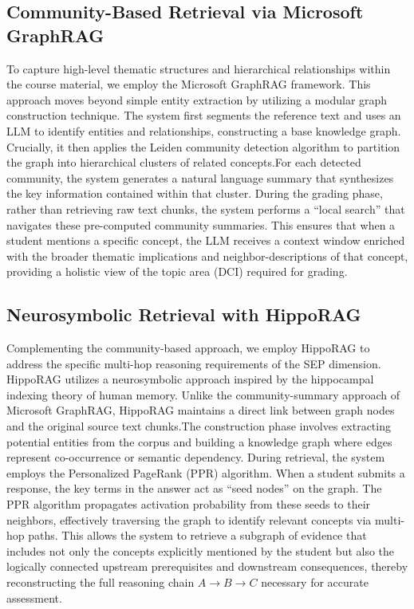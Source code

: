 \documentclass{edm_article}
\begin{document}
\subsection{Community-Based Retrieval via Microsoft GraphRAG}
To capture high-level thematic structures and hierarchical relationships within the course material, we employ the Microsoft GraphRAG framework. This approach moves beyond simple entity extraction by utilizing a modular graph construction technique. The system first segments the reference text and uses an LLM to identify entities and relationships, constructing a base knowledge graph. Crucially, it then applies the Leiden community detection algorithm to partition the graph into hierarchical clusters of related concepts.For each detected community, the system generates a natural language summary that synthesizes the key information contained within that cluster. During the grading phase, rather than retrieving raw text chunks, the system performs a ``local search'' that navigates these pre-computed community summaries. This ensures that when a student mentions a specific concept, the LLM receives a context window enriched with the broader thematic implications and neighbor-descriptions of that concept, providing a holistic view of the topic area (DCI) required for grading.

\subsection{Neurosymbolic Retrieval with HippoRAG}
Complementing the community-based approach, we employ HippoRAG to address the specific multi-hop reasoning requirements of the SEP dimension. HippoRAG utilizes a neurosymbolic approach inspired by the hippocampal indexing theory of human memory. Unlike the community-summary approach of Microsoft GraphRAG, HippoRAG maintains a direct link between graph nodes and the original source text chunks.The construction phase involves extracting potential entities from the corpus and building a knowledge graph where edges represent co-occurrence or semantic dependency. During retrieval, the system employs the Personalized PageRank (PPR) algorithm. When a student submits a response, the key terms in the answer act as ``seed nodes'' on the graph. The PPR algorithm propagates activation probability from these seeds to their neighbors, effectively traversing the graph to identify relevant concepts via multi-hop paths. This allows the system to retrieve a subgraph of evidence that includes not only the concepts explicitly mentioned by the student but also the logically connected upstream prerequisites and downstream consequences, thereby reconstructing the full reasoning chain $A \rightarrow B \rightarrow C$ necessary for accurate assessment.
\end{document}
